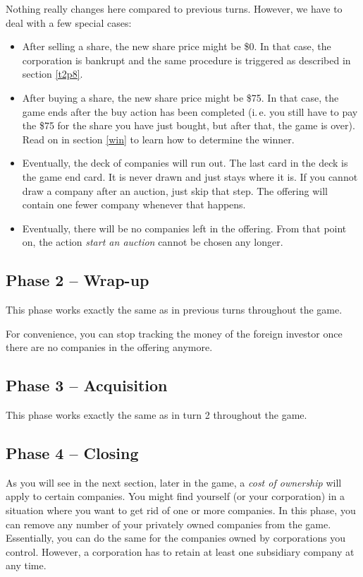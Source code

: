 \documentclass[10pt,final]{report}
\begin{document}
\begin{multicols}{2}
Nothing really changes here compared to previous turns. However, we
have to deal with a few special cases:
\begin{itemize}
\item After selling a share, the new share price might be \$0. In that
  case, the corporation is bankrupt and the same procedure is
  triggered as described in section \ref{t2p8}.
\item After buying a share, the new share price might be \$75. In
  that case, the game ends after the buy action has been completed
  (i.\,e. you still have to pay the \$75 for the share you have just
  bought, but after that, the game is over). Read on in section
  \ref{win} to learn how to determine the winner.
\item Eventually, the deck of companies will run out. The last card in
  the deck is the game end card. It is never drawn and just stays
  where it is. If you cannot draw a company after an
  auction, just skip that step. The offering will contain one fewer
  company whenever that happens.
\item Eventually, there will be no companies left in the
  offering. From that point on, the action \emph{start an auction}
  cannot be chosen any longer.
\end{itemize}

\subsection{Phase 2 -- Wrap-up}

This phase works exactly the same as in previous turns throughout the
game.

For convenience, you can stop tracking the money of the foreign
investor once there are no companies in the offering anymore.

\subsection{Phase 3 -- Acquisition}

This phase works exactly the same as in turn 2 throughout the game.

\subsection{Phase 4 -- Closing}
\label{t3p4}

As you will see in the next section, later in the game, a \emph{cost
  of ownership} will apply to certain companies. You might find
yourself (or your corporation) in a situation where you want to get
rid of one or more companies. In this phase, you can remove any number
of your privately owned companies from the game. Essentially, you can
do the same for the companies owned by corporations you
control. However, a corporation has to retain at least one subsidiary
company at any time.


\end{multicols}
\end{document}
